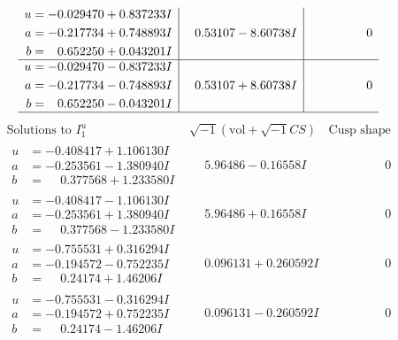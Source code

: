 \documentclass[1p]{elsarticle_modified}
\theoremstyle{definition}
\newcommand{\I}{\sqrt{-1}}
\begin{document}
$$\begin{array}{c|c|c}
\begin{aligned}
u &= -0.029470 + 0.837233 I \\
a &= -0.217734 + 0.748893 I \\
b &= \phantom{-}0.652250 + 0.043201 I\end{aligned}
 & \phantom{-}0.53107 - 8.60738 I & \phantom{-0.000000 } 0 \\ \hline\begin{aligned}
u &= -0.029470 - 0.837233 I \\
a &= -0.217734 - 0.748893 I \\
b &= \phantom{-}0.652250 - 0.043201 I\end{aligned}
 & \phantom{-}0.53107 + 8.60738 I & \phantom{-0.000000 } 0\\
 \hline 
 \end{array}$$\newpage$$\begin{array}{c|c|c}  
\text{Solutions to }I^u_{1}& \I (\text{vol} + \sqrt{-1}CS) & \text{Cusp shape}\\
 \hline 
\begin{aligned}
u &= -0.408417 + 1.106130 I \\
a &= -0.253561 - 1.380940 I \\
b &= \phantom{-}0.377568 + 1.233580 I\end{aligned}
 & \phantom{-}5.96486 - 0.16558 I & \phantom{-0.000000 } 0 \\ \hline\begin{aligned}
u &= -0.408417 - 1.106130 I \\
a &= -0.253561 + 1.380940 I \\
b &= \phantom{-}0.377568 - 1.233580 I\end{aligned}
 & \phantom{-}5.96486 + 0.16558 I & \phantom{-0.000000 } 0 \\ \hline\begin{aligned}
u &= -0.755531 + 0.316294 I \\
a &= -0.194572 - 0.752235 I \\
b &= \phantom{-}0.24174 + 1.46206 I\end{aligned}
 & \phantom{-}0.096131 + 0.260592 I & \phantom{-0.000000 } 0 \\ \hline\begin{aligned}
u &= -0.755531 - 0.316294 I \\
a &= -0.194572 + 0.752235 I \\
b &= \phantom{-}0.24174 - 1.46206 I\end{aligned}
 & \phantom{-}0.096131 - 0.260592 I & \phantom{-0.000000 } 0 \\ \hline\begin{aligned}

\end{aligned}
\end{array}$$
\end{document}

